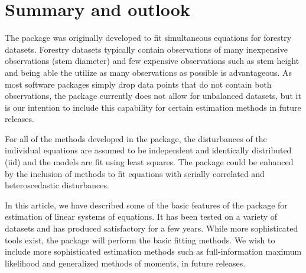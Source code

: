 

\section{Summary and outlook}\label{sec:Summmary}

The  package was originally developed to fit
simultaneous equations for forestry datasets. Forestry datasets
typically contain observations of many inexpensive observations
(stem diameter) and few expensive observations such
as stem height and being able the utilize as many observations as
possible is advantageous.
As most software packages simply drop data points that do not contain
both observations, the  package currently does not
allow for unbalanced datasets, but it is our intention to include this
capability for certain estimation methods in future releases.

For all of the methods developed in the package, the disturbances of
the individual equations are assumed to be independent and identically
distributed (iid) and the models are fit using least squares.  
The package could be enhanced by the inclusion of methods to fit
equations with serially correlated and heteroscedastic disturbances.

In this article, we have described some of the basic features of the
 package for estimation of linear systems of
equations. It has been tested on a variety of datasets and has
produced satisfactory for a few years. While more sophisticated tools
exist, the  package will perform the basic fitting
methods. We wish to include more sophisticated estimation methods such
as full-information maximum likelihood and generalized methods of
moments, in future releases. 





